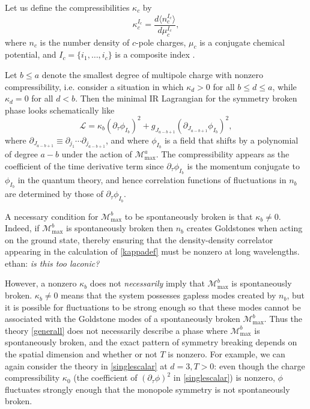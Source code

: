 \documentclass[pra,aps,twocolumn, amsfonts,amsmath,amssymb,nofootinbib,superscriptaddress]{revtex4-2}
\renewcommand{\max}{\text{max}}
\newcommand{\mmax}[1]{\mathcal{M}^{#1}_\max}
\newcommand{\ethan}[1]{ { \color{blue} \footnotesize \textsf{ethan: \textsl{#1}} }}
\newcommand\be            {\begin{equation}}
\newcommand\ee            {\end{equation}}
\newcommand{\p}{\partial}
\providecommand{\DIFaddtex}[1]{{\protect\color{blue}\uwave{#1}}} %
\providecommand{\DIFdeltex}[1]{{\protect\color{red}\sout{#1}}}                      %
\providecommand{\DIFaddbegin}{} %
\providecommand{\DIFaddend}{} %
\providecommand{\DIFdelbegin}{} %
\providecommand{\DIFdelend}{} %
\providecommand{\DIFadd}[1]{\texorpdfstring{\DIFaddtex{#1}}{#1}} %
\providecommand{\DIFdel}[1]{\texorpdfstring{\DIFdeltex{#1}}{}} %
\newcommand{\DIFscaledelfig}{0.5}
\newlength{\DIFdelgraphicswidth} %
\newlength{\DIFdelgraphicsheight} %
\newcommand{\DIFaddincludegraphics}[2][]{{\color{blue}\fbox{\DIFOincludegraphics[#1]{#2}}}} %
\newcommand{\DIFdelincludegraphics}[2][]{%
\sbox{\DIFdelgraphicsbox}{\DIFOincludegraphics[#1]{#2}}%
\settoboxwidth{\DIFdelgraphicswidth}{\DIFdelgraphicsbox} %
\settoboxtotalheight{\DIFdelgraphicsheight}{\DIFdelgraphicsbox} %
\scalebox{\DIFscaledelfig}{%
\parbox[b]{\DIFdelgraphicswidth}{\usebox{\DIFdelgraphicsbox}\\[-\baselineskip] \rule{\DIFdelgraphicswidth}{0em}}\llap{\resizebox{\DIFdelgraphicswidth}{\DIFdelgraphicsheight}{%
\setlength{\unitlength}{\DIFdelgraphicswidth}%
\begin{picture}(1,1)%
\thicklines\linethickness{2pt} %
{\color[rgb]{1,0,0}\put(0,0){\framebox(1,1){}}}%
{\color[rgb]{1,0,0}\put(0,0){\line( 1,1){1}}}%
{\color[rgb]{1,0,0}\put(0,1){\line(1,-1){1}}}%
\end{picture}%
}\hspace*{3pt}}} %
} %
\DeclareRobustCommand{\DIFaddbegin}{\DIFOaddbegin \let\includegraphics\DIFaddincludegraphics} %
\DeclareRobustCommand{\DIFaddend}{\DIFOaddend \let\includegraphics\DIFOincludegraphics} %
\DeclareRobustCommand{\DIFdelbegin}{\DIFOdelbegin \let\includegraphics\DIFdelincludegraphics} %
\DeclareRobustCommand{\DIFdelend}{\DIFOaddend \let\includegraphics\DIFOincludegraphics} %
\begin{document}
Let us define the compressibilities $\kappa_c$ by 
\be \label{kappadef} \kappa_c^{I_c} = \frac{d\langle n_c^{I_c}\rangle}{d\mu_c^{I_c}},\ee 
where $n_c$ is the number density of $c$-pole charges, $\mu_c$ is a conjugate chemical potential, and $I_c = \{i_1,\dots,i_c\}$ is a composite index \DIFaddbegin \DIFadd{as before}\DIFaddend .

Let $b\leq a$ denote the smallest degree of multipole charge with nonzero compressibility, i.e. consider a situation in which $\kappa_d>0$ for all $b\leq d\leq a$, while $\kappa_d=0$ for all $d<b$. Then the minimal IR Lagrangian for the symmetry broken phase looks schematically like 
\be \label{generall} \mathcal{L} = \kappa_b (\partial_\tau \phi_{I_b})^2 + g_{J_{a-b+1}}(\partial_{J_{a-b+1}}\phi_{I_b})^2,\ee 
where 
$\p_{J_{a-b+1}} \equiv \p_{j_1} \cdots \p_{j_{a-b+1}}$, and where $\phi_{I_b}$ is a field that shifts by a polynomial of degree $a-b$ under the action of $\mmax a$. The compressibility appears as the coefficient of the time derivative term since $\p_\tau \phi_{I_b}$ is the momentum conjugate to $\phi_{I_b}$ in the quantum theory, and hence correlation functions of fluctuations in $n_b$ are determined by those of $\p_\tau \phi_{I_b}$. 

A necessary condition for $\mmax b$ to be spontaneously broken is that $\kappa_b \neq 0$. Indeed, if $\mmax b$ is spontaneously broken then $n_b$ creates Goldstones when acting on the ground state, thereby ensuring that the density-density correlator appearing in the calculation of \eqref{kappadef} must be nonzero at long wavelengths. \ethan{is this too laconic?}

However, a nonzero $\kappa_b$ does not {\it necessarily} imply that $\mmax b$ is spontaneously broken. $\kappa_b\neq 0$ means that the system possesses gapless modes created by $n_b$, but it is possible for fluctuations to be strong enough so that these modes cannot be associated with the Goldstone modes of a spontaneously broken $\mmax b$. Thus the theory \eqref{generall} does not necessarily describe a phase where $\mmax b$ is spontaneously broken, and the exact pattern of symmetry breaking depends on the spatial dimension and whether or not $T$ is nonzero. For example, we can again consider the theory in \eqref{singlescalar} at \DIFdelbegin \DIFdel{$d=3,T>0$}\DIFdelend \DIFaddbegin \DIFadd{$d=3, T>0$}\DIFaddend : even though the charge compressibility $\kappa_0$ (the coefficient of $(\p_\tau\phi)^2$ in \eqref{singlescalar}) is nonzero, $\phi$ fluctuates strongly enough that the monopole symmetry is not spontaneously broken.
\end{document}
